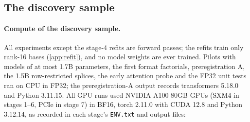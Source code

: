 \subsection{The discovery sample}\label{app:compute-discovery}

\paragraph{Compute of the discovery sample.} All experiments except the stage-4 refits are forward passes; the refits train only rank-16 bases (\cref{app:refit}), and no model weights are ever trained. Pilots with models of at most 1.7B parameters, the first format factorials, preregistration A, the 1.5B row-restricted splices, the early attention probe and the FP32 unit tests ran on CPU in FP32; the preregistration-A output records transformers 5.18.0 and Python 3.11.15. All GPU runs used NVIDIA A100 80GB GPUs (SXM4 in stages 1--6, PCIe in stage 7) in BF16, torch 2.11.0 with CUDA 12.8 and Python 3.12.14, as recorded in each stage's \texttt{ENV.txt} and output files:
